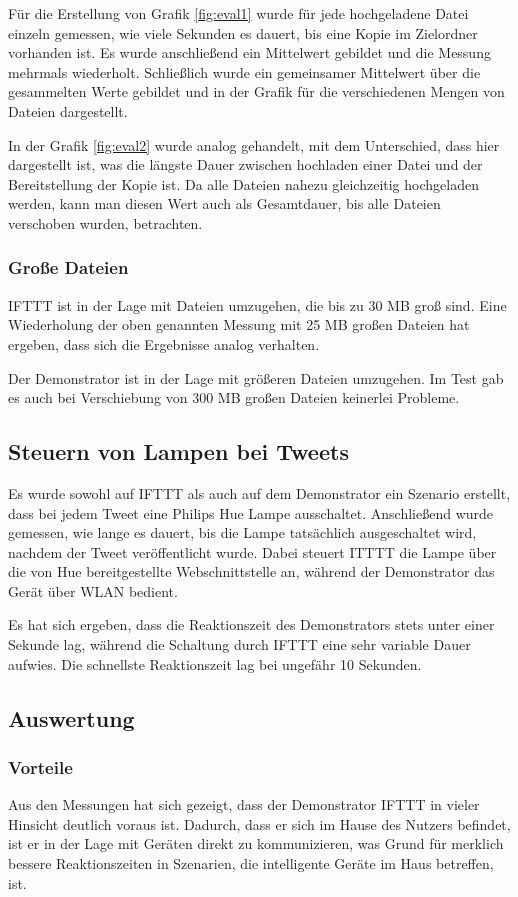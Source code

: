 Für die Erstellung von Grafik \ref{fig:eval1} wurde für jede hochgeladene Datei einzeln gemessen, wie viele Sekunden es dauert, bis eine Kopie im Zielordner vorhanden ist. Es wurde anschließend ein Mittelwert gebildet und die Messung mehrmals wiederholt. Schließlich wurde ein gemeinsamer Mittelwert über die gesammelten Werte gebildet und in der Grafik für die verschiedenen Mengen von Dateien dargestellt.

In der Grafik \ref{fig:eval2} wurde analog gehandelt, mit dem Unterschied, dass hier dargestellt ist, was die längste Dauer zwischen hochladen einer Datei und der Bereitstellung der Kopie ist. Da alle Dateien nahezu gleichzeitig hochgeladen werden, kann man diesen Wert auch als Gesamtdauer, bis alle Dateien verschoben wurden, betrachten.

\subsubsection{Große Dateien}
IFTTT ist in der Lage mit Dateien umzugehen, die bis zu 30 MB groß sind. Eine Wiederholung der oben genannten Messung mit 25 MB großen Dateien hat ergeben, dass sich die Ergebnisse  analog verhalten. 

Der Demonstrator ist in der Lage mit größeren Dateien umzugehen. Im Test gab es auch bei Verschiebung von 300 MB großen Dateien keinerlei Probleme.

\subsection{Steuern von Lampen bei Tweets}
Es wurde sowohl auf IFTTT als auch auf dem Demonstrator ein Szenario erstellt, dass bei jedem Tweet eine Philips Hue Lampe ausschaltet. Anschließend wurde gemessen, wie lange es dauert, bis die Lampe tatsächlich ausgeschaltet wird, nachdem der Tweet veröffentlicht wurde. Dabei steuert ITTTT die Lampe über die von Hue bereitgestellte Webschnittstelle an, während der Demonstrator das Gerät über WLAN bedient.

Es hat sich ergeben, dass die Reaktionszeit des Demonstrators stets unter einer Sekunde lag, während die Schaltung durch IFTTT eine sehr variable Dauer aufwies. Die schnellste Reaktionszeit lag bei ungefähr 10 Sekunden.


\subsection{Auswertung}
\subsubsection{Vorteile}
Aus den Messungen hat sich gezeigt, dass der Demonstrator IFTTT in vieler Hinsicht deutlich voraus ist. Dadurch, dass er sich im Hause des Nutzers befindet, ist er in der Lage mit Geräten direkt zu kommunizieren, was Grund für merklich bessere Reaktionszeiten in Szenarien, die intelligente Geräte im Haus betreffen, ist.\\

